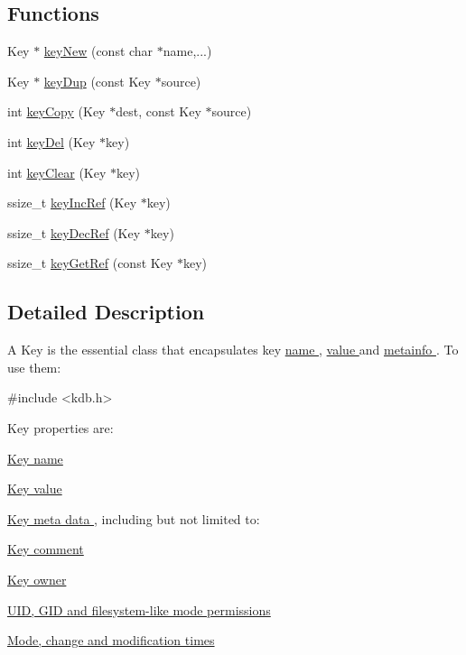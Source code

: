 \subsection*{Functions}
\begin{DoxyCompactItemize}
\item 
Key $\ast$ \hyperlink{group__key_gad23c65b44bf48d773759e1f9a4d43b89}{key\-New} (const char $\ast$name,...)
\item 
Key $\ast$ \hyperlink{group__key_gae6ec6a60cc4b8c1463fa08623d056ce3}{key\-Dup} (const Key $\ast$source)
\item 
int \hyperlink{group__key_ga6a12cbbe656a1ad9f41b8c681d7a2f92}{key\-Copy} (Key $\ast$dest, const Key $\ast$source)
\item 
int \hyperlink{group__key_ga3df95bbc2494e3e6703ece5639be5bb1}{key\-Del} (Key $\ast$key)
\item 
int \hyperlink{group__key_gab2242311a36bbc0520e0d36895107ec1}{key\-Clear} (Key $\ast$key)
\item 
ssize\-\_\-t \hyperlink{group__key_ga6970a6f254d67af7e39f8e469bb162f1}{key\-Inc\-Ref} (Key $\ast$key)
\item 
ssize\-\_\-t \hyperlink{group__key_ga2c6433ca22109e4e141946057eccb283}{key\-Dec\-Ref} (Key $\ast$key)
\item 
ssize\-\_\-t \hyperlink{group__key_ga4aabc4272506dd63161db2bbb42de8ae}{key\-Get\-Ref} (const Key $\ast$key)
\end{DoxyCompactItemize}


\subsection{Detailed Description}
A Key is the essential class that encapsulates key \hyperlink{group__keyname}{name }, \hyperlink{group__keyvalue}{value } and \hyperlink{group__keymeta}{metainfo }. To use them\-: 
\begin{DoxyCode}
\textcolor{preprocessor}{#include <kdb.h>}
\end{DoxyCode}


Key properties are\-:
\begin{DoxyItemize}
\item \hyperlink{group__keyname}{Key name }
\item \hyperlink{group__keyvalue}{Key value }
\item \hyperlink{group__keymeta}{Key meta data }, including but not limited to\-:
\begin{DoxyItemize}
\item \hyperlink{group__keyvalue_gafb89735689929ff717cc9f2d0d0b46a2}{Key comment }
\item \hyperlink{group__keyname_ga35922a017bee8b4bcb493bbdfad9d6f5}{Key owner }
\item \hyperlink{group__keymeta}{U\-I\-D, G\-I\-D and filesystem-\/like mode permissions }
\item \hyperlink{group__keymeta}{Mode, change and modification times }
\end{DoxyItemize}
\end{DoxyItemize}

